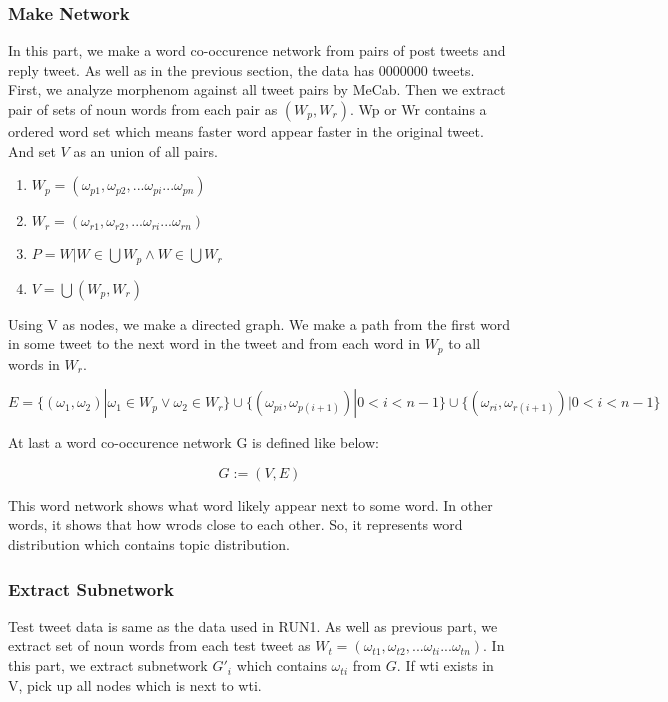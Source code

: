 \documentclass{sig-alternate}
\begin{document}
\subsubsection{Make Network}
In this part, we make a word co-occurence network from pairs of post tweets and reply tweet.
As well as in the previous section, the data has 0000000 tweets. 
First, we analyze morphenom against all tweet pairs by MeCab. Then we extract pair of sets of noun words from each pair as \((W_{p}, W_{r})\). Wp or Wr contains a ordered word set which means faster word appear faster in the original tweet. And set \(V\) as an union of all pairs.

\begin{enumerate}
    \item \(W_{p} = (\omega_{p1}, \omega_{p2}, ... \omega_{pi} ... \omega_{pn}) \)
    \item \(W_{r} = (\omega_{r1}, \omega_{r2}, ... \omega_{ri} ... \omega_{rn}) \)
    \item \(P = {W | W \in \bigcup W_{p} \wedge W \in \bigcup W_{r}}\)
    \item \(V = \bigcup (W_{p}, W_{r})\)
\end{enumerate}

Using V as nodes, we make a directed graph. We make a path from the first word in some tweet to the next word in the tweet and from each word in \( W_{p} \) to all words in \(W_{r} \).

\[E = \{(\omega_{1}, \omega_{2}) | \omega_{1}\in W_{p} \lor \omega_{2}\in W_{r}\}
\cup \{(\omega_{pi}, \omega_{p(i+1)}) | 0 < i < n-1\}
\cup \{(\omega_{ri}, \omega_{r(i+1)}) | 0 < i < n-1\}
\]

At last a word co-occurence network G is defined like below:

\[G := (V,E)\]

This word network shows what word likely appear next to some word. In other words, it shows that how wrods close to each other. So, it represents word distribution which contains topic distribution.

\subsubsection{Extract Subnetwork}
Test tweet data is same as the data used in RUN1. As well as previous part, we extract set of noun words from each test tweet as \(W_{t} = (\omega_{t1}, \omega_{t2}, ... \omega_{ti} ... \omega_{tn})\).
In this part, we extract subnetwork $G'_{i}$ which contains \(\omega_{ti}\) from $G$.
If wti exists in V, pick up all nodes which is next to wti.
\end{document}
